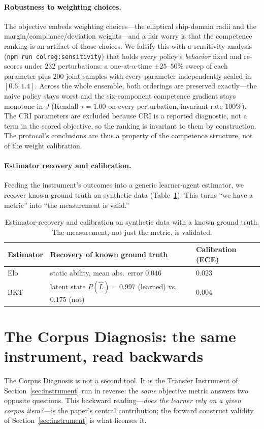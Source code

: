 \documentclass{article}
\begin{document}
\paragraph{Robustness to weighting choices.} The objective embeds weighting choices---the
elliptical ship-domain radii and the margin/compliance/deviation weights---and a fair worry
is that the competence ranking is an artifact of those choices. We falsify this with a
sensitivity analysis (\texttt{npm run colreg:sensitivity}) that holds every policy's
\emph{behavior} fixed and re-scores under $232$ perturbations: a one-at-a-time
$\pm25$--$50\%$ sweep of each parameter plus $200$ joint samples with every parameter
independently scaled in $[0.6, 1.4]$. Across the whole ensemble, both orderings are
preserved exactly---the naive policy stays worst and the six-component competence gradient
stays monotone in $J$ (Kendall $\tau=1.00$ on every perturbation, invariant rate $100\%$).
The CRI parameters are excluded because CRI is a reported diagnostic, not a term in the
scored objective, so the ranking is invariant to them by construction. The protocol's
conclusions are thus a property of the competence structure, not of the weight calibration.

\paragraph{Estimator recovery and calibration.} Feeding the instrument's outcomes into a
generic learner-agent estimator, we recover known ground truth on synthetic data
(Table~\ref{tab:recovery}). This turns ``we have a metric'' into ``the measurement is
valid.''

\begin{table}[t]
\centering
\small
\begin{tabular}{@{}lll@{}}
\toprule
Estimator & Recovery of known ground truth & Calibration (ECE) \\
\midrule
Elo & static ability, mean abs.\ error $0.046$ & $0.023$ \\
BKT & latent state $P(\hat L)=0.997$ (learned) vs.\ $0.175$ (not) & $0.004$ \\
\bottomrule
\end{tabular}
\caption{Estimator-recovery and calibration on synthetic data with a known ground truth.
The measurement, not just the metric, is validated.}
\label{tab:recovery}
\end{table}

\section{The Corpus Diagnosis: the same instrument, read backwards}
\label{sec:diagnosis}
The Corpus Diagnosis is not a second tool. It is the Transfer Instrument of
Section~\ref{sec:instrument} run in reverse: the \emph{same} objective metric answers two
opposite questions. This backward reading---\emph{does the learner rely on a given corpus item?}---is
the paper's central contribution; the forward construct validity of Section~\ref{sec:instrument} is
what licenses it.
\end{document}

